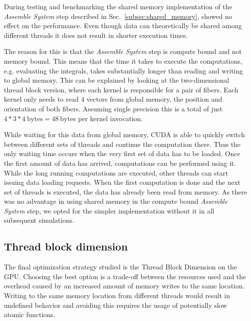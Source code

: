 During testing and benchmarking the shared memory implementation of the \emph{Assemble System} step described in Sec.~\ref{subsec:shared_memory}, showed no effect on the performance. Even though data can theoretically be shared among different threads it does not result in shorter execution times.

The reason for this is that the \emph{Assemble System} step is compute bound and not memory bound. This means that the time it takes to execute the computations, e.g. evaluating the integrals, takes substantially longer than reading and writing to global memory. This can be explained by looking at the two-dimensional thread block version, where each kernel is responsible for a pair of fibers. Each kernel only needs to read $4$ vectors from global memory, the position and orientation of both fibers. Assuming single precision this is a total of just $4 * 3 * 4~\text{bytes} = 48~\text{bytes}$ per kernel invocation.

While waiting for this data from global memory, CUDA is able to quickly switch between different sets of threads and continue the computation there. Thus the only waiting time occurs when the very first set of data has to be loaded. Once the first amount of data has arrived, computations can be performed using it. While the long running computations are executed, other threads can start issuing data loading requests. When the first computation is done and the next set of threads is executed, the data has already been read from memory. As there was no advantage in using shared memory in the compute bound \emph{Assemble System} step, we opted for the simpler implementation without it in all subsequent simulations.

\subsection{Thread block dimension}
\label{subsec:bench_thread_block}

The final optimization strategy studied is the Thread Block Dimension on the GPU. Choosing the best option is a trade-off between the resources used and the overhead caused by an increased amount of memory writes to the same location. Writing to the same memory location from different threads would result in undefined behavior and avoiding this requires the usage of potentially slow atomic functions.

